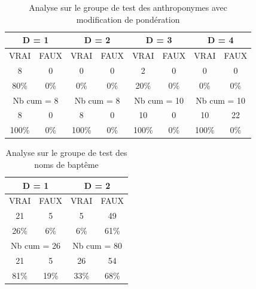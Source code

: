 \renewcommand{\arraystretch} {1.25}
\begin{table}[ht]
    \centering
    \begin{tabular}{|c|c|c|c|c|c|c|c|}
        \hline \multicolumn{2}{|c}{D = 1}& \multicolumn{2}{|c}{D = 2} & \multicolumn{2}{|c}{D = 3} & \multicolumn{2}{|c|}{D = 4} \\
        \hline VRAI & FAUX & VRAI & FAUX & VRAI & FAUX & VRAI & FAUX \\
        \hline \hline  8 & 0 & 0 & 0 & 2 & 0 & 0 & 0 \\
        \hline 80\% & 0\% & 0\% & 0\% & 20\% & 0\% & 0\% & 0\%  \\
        \hline \hline \multicolumn{2}{|c}{Nb cum = 8}& \multicolumn{2}{|c|}{Nb cum = 8} & \multicolumn{2}{c|}{Nb cum = 10} & \multicolumn{2}{c|}{Nb cum = 10} \\
        \hline \hline  8 & 0 & 8 & 0 & 10 & 0 & 10 & 22 \\
        \hline 100\% & 0\% & 100\% & 0\% & 100\% & 0\% & 100\% & 0\%  \\
        \hline 
    \end{tabular}
    \begin{center}
        \caption{Analyse sur le groupe  de test des anthroponymes avec modification de pondération}
    \end{center}
    
    \label{groupe_anthro_md}
\end{table}

\renewcommand{\arraystretch} {1.25}
\begin{table}[ht]
    \centering
    \begin{tabular}{|c|c|c|c|}
        \hline \multicolumn{2}{|c}{D = 1}& \multicolumn{2}{|c|}{D = 2}\\
        \hline VRAI & FAUX & VRAI & FAUX \\
        \hline \hline  21 & 5 & 5 & 49 \\
        \hline 26\% & 6\% & 6\% & 61\% \\
        \hline \hline \multicolumn{2}{|c}{Nb cum = 26}& \multicolumn{2}{|c|}{Nb cum = 80}\\
        \hline \hline  21 & 5 & 26 & 54 \\
        \hline 81\% & 19\% & 33\% & 68\% \\
        \hline 
    \end{tabular}
    \caption{Analyse sur le groupe  de test des noms de baptême}
    \label{groupe_prenom}
\end{table}

